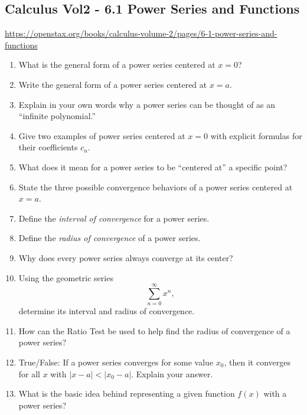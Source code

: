 \subsection{Calculus Vol2 - 6.1 Power Series and Functions}

\url{https://openstax.org/books/calculus-volume-2/pages/6-1-power-series-and-functions}

\begin{enumerate}

\item What is the general form of a power series centered at \(x=0\)?

\item Write the general form of a power series centered at \(x=a\).

\item Explain in your own words why a power series can be thought of as an “infinite polynomial.”

\item Give two examples of power series centered at \(x=0\) with explicit formulas for their coefficients \(c_n\).

\item What does it mean for a power series to be “centered at” a specific point?

\item State the three possible convergence behaviors of a power series centered at \(x=a\).

\item Define the \emph{interval of convergence} for a power series.

\item Define the \emph{radius of convergence} of a power series.

\item Why does every power series always converge at its center?

\item Using the geometric series
  \[
    \sum_{n=0}^\infty x^n,
  \]
  determine its interval and radius of convergence.

\item How can the Ratio Test be used to help find the radius of convergence of a power series?

\item True/False: If a power series converges for some value \(x_0\), then it converges for all \(x\) with \(|x-a|<|x_0-a|\). Explain your answer.

\item What is the basic idea behind representing a given function \(f(x)\) with a power series?


\end{enumerate}
